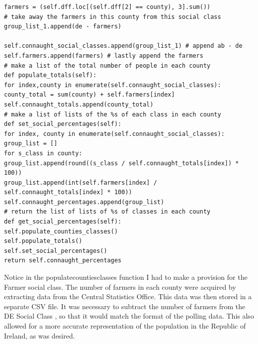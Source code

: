 \begin{verbatim}
farmers = (self.dff.loc[(self.dff[2] == county), 3].sum())
# take away the farmers in this county from this social class
group_list_1.append(de - farmers) 

self.connaught_social_classes.append(group_list_1) # append ab - de
self.farmers.append(farmers) # lastly append the farmers
# make a list of the total number of people in each county
def populate_totals(self): 
for index,county in enumerate(self.connaught_social_classes):
county_total = sum(county) + self.farmers[index]
self.connaught_totals.append(county_total)
# make a list of lists of the %s of each class in each county
def set_social_percentages(self): 
for index, county in enumerate(self.connaught_social_classes):
group_list = []
for s_class in county:
group_list.append(round((s_class / self.connaught_totals[index]) * 100))
group_list.append(int(self.farmers[index] / self.connaught_totals[index] * 100))
self.connaught_percentages.append(group_list)
# return the list of lists of %s of classes in each county
def get_social_percentages(self): 
self.populate_counties_classes()
self.populate_totals()
self.set_social_percentages()
return self.connaught_percentages
\end{verbatim}
Notice in the populate\textunderscore counties\textunderscore classes function I had to make a provision for the Farmer social class. The number of farmers in each county were acquired by extracting data from the Central Statistics Office. This data was then stored in a separate CSV file. It was necessary to subtract the number of farmers from the DE Social Class \cite{pfizer}, so that it would match the format of the polling data. This also allowed for a more accurate representation of the population in the Republic of Ireland, as was desired.
